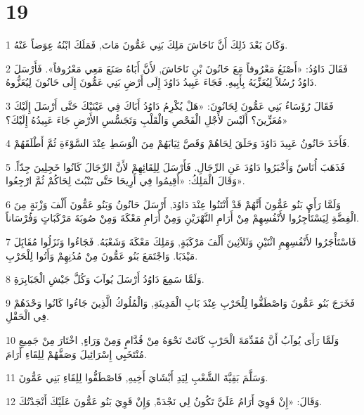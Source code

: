 \chapter{19}

\par 1 وَكَانَ بَعْدَ ذَلِكَ أَنَّ نَاحَاشَ مَلِكَ بَنِي عَمُّونَ مَاتَ, فَمَلَكَ ابْنُهُ عِوَضاً عَنْهُ.
\par 2 فَقَالَ دَاوُدُ: «أَصْنَعُ مَعْرُوفاً مَعَ حَانُونَ بْنِ نَاحَاشَ, لأَنَّ أَبَاهُ صَنَعَ مَعِي مَعْرُوفاً». فَأَرْسَلَ دَاوُدُ رُسُلاً لِيُعَزِّيَهُ بِأَبِيهِ. فَجَاءَ عَبِيدُ دَاوُدَ إِلَى أَرْضِ بَنِي عَمُّونَ إِلَى حَانُونَ لِيُعَزُّوهُ.
\par 3 فَقَالَ رُؤَسَاءُ بَنِي عَمُّونَ لِحَانُونَ: «هَلْ يُكْرِمُ دَاوُدُ أَبَاكَ فِي عَيْنَيْكَ حَتَّى أَرْسَلَ إِلَيْكَ مُعَزِّينَ؟ أَلَيْسَ لأَجْلِ الْفَحْصِ وَالْقَلْبِ وَتَجَسُّسِ الأَرْضِ جَاءَ عَبِيدُهُ إِلَيْكَ؟»
\par 4 فَأَخَذَ حَانُونُ عَبِيدَ دَاوُدَ وَحَلَقَ لِحَاهُمْ وَقَصَّ ثِيَابَهُمْ مِنَ الْوَسَطِ عِنْدَ السَّوْءَةِ ثُمَّ أَطْلَقَهُمْ.
\par 5 فَذَهَبَ أُنَاسٌ وَأَخْبَرُوا دَاوُدَ عَنِ الرِّجَالِ. فَأَرْسَلَ لِلِقَائِهِمْ لأَنَّ الرِّجَالَ كَانُوا خَجِلِينَ جِدّاً. وَقَالَ الْمَلِكُ: «أَقِيمُوا فِي أَرِيحَا حَتَّى تَنْبُتَ لِحَاكُمْ ثُمَّ ارْجِعُوا».
\par 6 وَلَمَّا رَأَى بَنُو عَمُّونَ أَنَّهُمْ قَدْ أَنْتَنُوا عِنْدَ دَاوُدَ, أَرْسَلَ حَانُونُ وَبَنُو عَمُّونَ أَلْفَ وَزْنَةٍ مِنَ الْفِضَّةِ لِيَسْتَأْجِرُوا لأَنْفُسِهِمْ مِنْ أَرَامِ النَّهْرَيْنِ وَمِنْ أَرَامِ مَعْكَةَ وَمِنْ صُوبَةَ مَرْكَبَاتٍ وَفُرْسَاناً.
\par 7 فَاسْتَأْجَرُوا لأَنْفُسِهِمِ اثْنَيْنِ وَثَلاَثِينَ أَلْفَ مَرْكَبَةٍ, وَمَلِكَ مَعْكَةَ وَشَعْبَهُ. فَجَاءُوا وَنَزَلُوا مُقَابَِلَ مَيْدَبَا. وَاجْتَمَعَ بَنُو عَمُّونَ مِنْ مُدُنِهِمْ وَأَتُوا لِلْحَرْبِ.
\par 8 وَلَمَّا سَمِعَ دَاوُدُ أَرْسَلَ يُوآبَ وَكُلَّ جَيْشِ الْجَبَابِرَةِ.
\par 9 فَخَرَجَ بَنُو عَمُّونَ وَاصْطَفُّوا لِلْحَرْبِ عِنْدَ بَابِ الْمَدِينَةِ, وَالْمُلُوكُ الَّذِينَ جَاءُوا كَانُوا وَحْدَهُمْ فِي الْحَقْلِ.
\par 10 وَلَمَّا رَأَى يُوآبُ أَنَّ مُقَدِّمَةَ الْحَرْبِ كَانَتْ نَحْوَهُ مِنْ قُدَّامٍ وَمِنْ وَرَاءٍ, اخْتَارَ مِنْ جَمِيعِ مُنْتَخَبِي إِسْرَائِيلَ وَصَفَّهُمْ لِلِقَاءِ أَرَامَ.
\par 11 وَسَلَّمَ بَقِيَّةَ الشَّعْبِ لِيَدِ أَبْشَايَ أَخِيهِ, فَاصْطَفُّوا لِلِقَاءِ بَنِي عَمُّونَ.
\par 12 وَقَالَ: «إِنْ قَوِيَ أَرَامُ عَلَيَّ تَكُونُ لِي نَجْدَةً, وَإِنْ قَوِيَ بَنُو عَمُّونَ عَلَيْكَ أَنْجَدْتُكَ.
